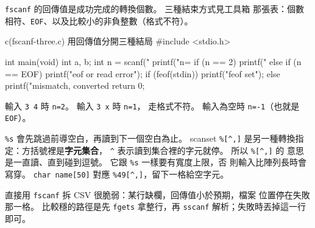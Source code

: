 \texttt{fscanf} 的回傳值是成功完成的轉換個數。 三種結束方式見工具箱
那張表：個數相符、\texttt{EOF}、以及比較小的非負整數（格式不符）。

\begin{example}{c}{(fscanf-three.c) 用回傳值分開三種結局}
#include <stdio.h>

int main(void) {
    int a, b;
    int n = scanf("%
    printf("n=%
    if (n == 2) {
        printf("%
    } else if (n == EOF) {
        printf("eof or read error\n");
        if (feof(stdin)) {
            printf("feof set\n");
        }
    } else {
        printf("mismatch, converted %
    }
    return 0;
}
\end{example}

輸入 \texttt{3 4} 時 \texttt{n=2}。 輸入 \texttt{3 x} 時 \texttt{n=1}，
走格式不符。 輸入為空時 \texttt{n=-1}（也就是 \texttt{EOF}）。

\texttt{\%s} 會先跳過前導空白，再讀到下一個空白為止。 scanset
\texttt{\%[\^{},]} 是另一種轉換指定：方括號裡是\textbf{字元集合}，
\texttt{\^{}} 表示讀到集合裡的字元就停。 所以 \texttt{\%[\^{},]} 的
意思是一直讀、直到碰到逗號。 它跟 \texttt{\%s} 一樣要有寬度上限，否
則輸入比陣列長時會寫穿。 \texttt{char name[50]} 對應
\texttt{\%49[\^{},]}，留下一格給空字元。

直接用 \texttt{fscanf} 拆 CSV 很脆弱：某行缺欄，回傳值小於預期，檔案
位置停在失敗那一格。 比較穩的路徑是先 \texttt{fgets} 拿整行，再
\texttt{sscanf} 解析；失敗時丟掉這一行即可。



